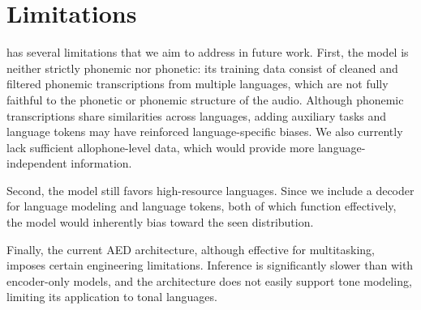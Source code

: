 \section*{Limitations}
\POWSM has several limitations that we aim to address in future work.
First, the model is neither strictly phonemic nor phonetic: its training data consist of cleaned and filtered phonemic transcriptions from multiple languages, which are not fully faithful to the phonetic or phonemic structure of the audio. Although phonemic transcriptions share similarities across languages, adding auxiliary tasks and language tokens may have reinforced language-specific biases. We also currently lack sufficient allophone-level data, which would provide more language-independent information.

Second, the model still favors high-resource languages. Since we include a decoder for language modeling and language tokens, both of which function effectively, the model would inherently bias toward the seen distribution.

Finally, the current AED architecture, although effective for multitasking, imposes certain engineering limitations. Inference is significantly slower than with encoder-only models, and the architecture does not easily support tone modeling, limiting its application to tonal languages.


